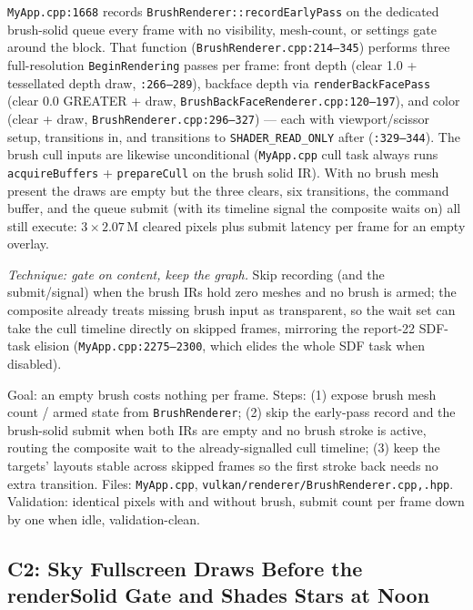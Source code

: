 \documentclass[11pt,a4paper]{article}
\begin{document}
\texttt{MyApp.cpp:1668} records \texttt{BrushRenderer::recordEarlyPass} on
the dedicated brush-solid queue every frame with no visibility, mesh-count,
or settings gate around the block. That function
(\texttt{BrushRenderer.cpp:214--345}) performs three full-resolution
\texttt{BeginRendering} passes per frame: front depth (clear 1.0 + tessellated
depth draw, \texttt{:266--289}), backface depth via
\texttt{renderBackFacePass} (clear 0.0 GREATER + draw,
\texttt{BrushBackFaceRenderer.cpp:120--197}), and color (clear + draw,
\texttt{BrushRenderer.cpp:296--327}) --- each with viewport/scissor setup,
transitions in, and transitions to \texttt{SHADER\_READ\_ONLY} after
(\texttt{:329--344}). The brush cull inputs are likewise unconditional
(\texttt{MyApp.cpp} cull task always runs \texttt{acquireBuffers} +
\texttt{prepareCull} on the brush solid IR). With no brush mesh present the
draws are empty but the three clears, six transitions, the command buffer,
and the queue submit (with its timeline signal the composite waits on) all
still execute: $3 \times 2.07$\,M cleared pixels plus submit latency per
frame for an empty overlay.

\textit{Technique: gate on content, keep the graph.} Skip recording (and the
submit/signal) when the brush IRs hold zero meshes and no brush is armed;
the composite already treats missing brush input as transparent, so the
wait set can take the cull timeline directly on skipped frames, mirroring
the report-22 SDF-task elision (\texttt{MyApp.cpp:2275--2300}, which elides
the whole SDF task when disabled).

\begin{tcolorbox}[promptbox={Prompt --- C1: content-gated brush tail}]
Goal: an empty brush costs nothing per frame. Steps: (1) expose brush mesh
count / armed state from \texttt{BrushRenderer}; (2) skip the early-pass
record and the brush-solid submit when both IRs are empty and no brush
stroke is active, routing the composite wait to the already-signalled cull
timeline; (3) keep the targets' layouts stable across skipped frames so the
first stroke back needs no extra transition. Files:
\texttt{MyApp.cpp}, \texttt{vulkan/renderer/BrushRenderer.cpp,.hpp}.
Validation: identical pixels with and without brush, submit count per frame
down by one when idle, validation-clean.
\end{tcolorbox}

\subsection{C2: Sky Fullscreen Draws Before the renderSolid Gate and Shades Stars at Noon}
\label{sec:c2}
\end{document}
